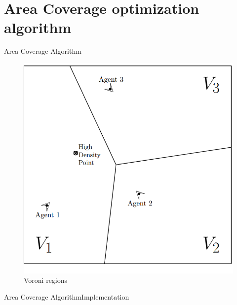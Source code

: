 \documentclass{beamer}
\begin{document}
\section{Area Coverage optimization algorithm}
\begin{frame}{Area Coverage Algorithm}
\begin{center}
\begin{figure}
\includegraphics[scale=0.3]{figs/img/voroni.png}
\caption{Voroni regions}
\end{figure}
\end{center}
\end{frame}
\begin{frame}{Area Coverage Algorithm}{Implementation}
\end{frame}
\end{document}
